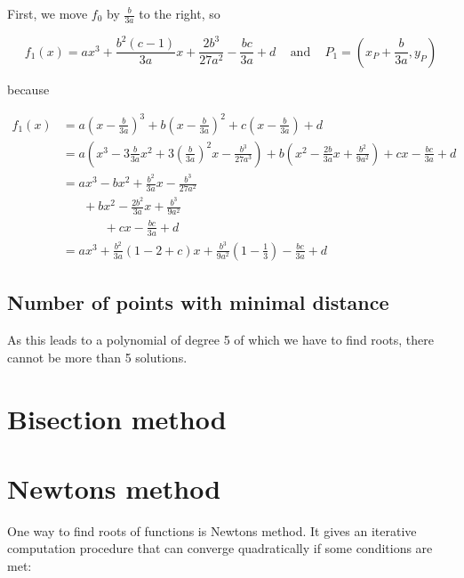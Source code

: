 \documentclass[a4paper]{scrartcl}
\theoremstyle{break}
\theoremstyle{nonumberplain}
\begin{document}
First, we move $f_0$ by $\frac{b}{3a}$ to the right, so

\[f_1(x) = ax^3 + \frac{b^2 (c-1)}{3a} x + \frac{2b^3}{27 a^2} - \frac{bc}{3a} + d \;\;\;\text{ and }\;\;\;P_1 = (x_P + \frac{b}{3a}, y_P)\]

because

\begin{align}
    f_1(x) &= a \left (x - \frac{b}{3a} \right )^3 + b \left (x-\frac{b}{3a} \right )^2 + c \left (x-\frac{b}{3a} \right ) + d\\
           &= a \left (x^3 - 3 \frac{b}{3a}x^2 + 3 (\frac{b}{3a})^2 x - \frac{b^3}{27a^3} \right )
             +b \left (x^2 - \frac{2b}{3a} x + \frac{b^2}{9a^2} \right )
             +c x - \frac{bc}{3a} + d\\
            &= ax^3 - bx^2 + \frac{b^2}{3a}x - \frac{b^3}{27 a^2}\\
            & \;\;\;\;\;\;+ bx^2 - \frac{2b^2}{3a}x + \frac{b^3}{9a^2}\\
            & \;\;\;\;\;\;\;\;\;\;\;\; + c x - \frac{bc}{3a} + d\\
            &= ax^3 + \frac{b^2}{3a}\left (1-2+c \right )x + \frac{b^3}{9a^2} \left (1-\frac{1}{3} \right )- \frac{bc}{3a} + d
\end{align}

\subsection{Number of points with minimal distance}
As this leads to a polynomial of degree 5 of which we have to find
roots, there cannot be more than 5 solutions.

\section{Bisection method}

\section{Newtons method}
One way to find roots of functions is Newtons method. It gives an
iterative computation procedure that can converge quadratically 
if some conditions are met:
\end{document}

